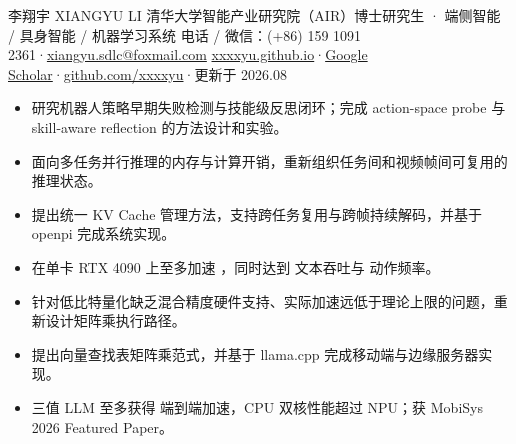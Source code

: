 \documentclass{resume-refined}
\begin{document}
\ResumeHeader
  {李翔宇}
  {XIANGYU LI}
  {清华大学智能产业研究院（AIR）博士研究生 · 端侧智能 / 具身智能 / 机器学习系统}
  {电话 / 微信：(+86) 159 1091 2361\quad·\quad \href{mailto:xiangyu.sdlc@foxmail.com}{xiangyu.sdlc@foxmail.com}}
  {\href{https://xxxxyu.github.io}{xxxxyu.github.io}\quad·\quad \href{https://scholar.google.com/citations?user=IjoWeIMAAAAJ}{Google Scholar}\quad·\quad \href{https://github.com/xxxxyu}{github.com/xxxxyu}\quad·\quad 更新于 2026.08}


\begin{itemize}
  \item 研究机器人策略早期失败检测与技能级反思闭环；完成 action-space probe 与 skill-aware reflection 的方法设计和实验。
\end{itemize}

\begin{itemize}
  \item 面向多任务并行推理的内存与计算开销，重新组织任务间和视频帧间可复用的推理状态。
  \item 提出统一 KV Cache 管理方法，支持跨任务复用与跨帧持续解码，并基于 openpi 完成系统实现。
  \item 在单卡 RTX 4090 上至多加速 ，同时达到  文本吞吐与  动作频率。
\end{itemize}

\begin{itemize}
  \item 针对低比特量化缺乏混合精度硬件支持、实际加速远低于理论上限的问题，重新设计矩阵乘执行路径。
  \item 提出向量查找表矩阵乘范式，并基于 llama.cpp 完成移动端与边缘服务器实现。
  \item 三值 LLM 至多获得  端到端加速，CPU 双核性能超过 NPU；获 MobiSys 2026 Featured Paper。
\end{itemize}
\end{document}
